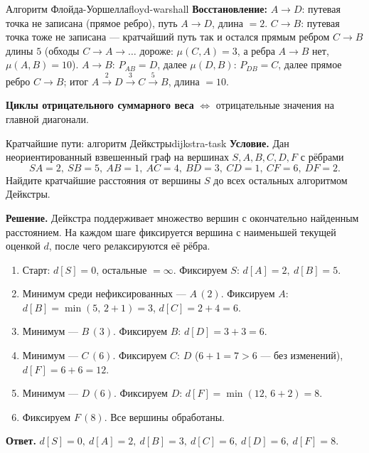 \begin{algo}{Алгоритм Флойда-Уоршелла}{floyd-warshall}
\textbf{Восстановление:}
$A \to D$: путевая точка не записана (прямое ребро), путь $A \to D$,
длина $= 2$.
$C \to B$: путевая точка тоже не записана --- кратчайший путь так и
остался прямым ребром $C \to B$ длины $5$ (обходы $C \to A \to \ldots$
дороже: $\mu(C,A) = 3$, а ребра $A \to B$ нет, $\mu(A,B) = 10$).
$A \to B$: $P_{AB} = D$, далее $\mu(D, B)$: $P_{DB} = C$, далее прямое
ребро $C \to B$; итог $A \xrightarrow{2} D \xrightarrow{3} C
\xrightarrow{5} B$, длина $= 10$.

\textbf{Циклы отрицательного суммарного веса} $\Leftrightarrow$ отрицательные значения на главной диагонали.

\end{algo}

\begin{task}{Кратчайшие пути: алгоритм Дейкстры}{dijkstra-task}
\textbf{Условие.} Дан неориентированный взвешенный граф на вершинах
$S,A,B,C,D,F$ с рёбрами
\[
  SA=2,\ SB=5,\ AB=1,\ AC=4,\ BD=3,\ CD=1,\ CF=6,\ DF=2.
\]
Найдите кратчайшие расстояния от вершины $S$ до всех остальных алгоритмом Дейкстры.

\smallskip
{}

\textbf{Решение.} Дейкстра поддерживает множество вершин с окончательно
найденным расстоянием. На каждом шаге фиксируется вершина с наименьшей текущей
оценкой $d$, после чего релаксируются её рёбра.
\begin{enumerate}
  \item Старт: $d[S]=0$, остальные $=\infty$. Фиксируем $S$:
        $d[A]=2,\ d[B]=5$.
  \item Минимум среди нефиксированных --- $A\,(2)$. Фиксируем $A$:
        $d[B]=\min(5,\,2+1)=3$, $d[C]=2+4=6$.
  \item Минимум --- $B\,(3)$. Фиксируем $B$: $d[D]=3+3=6$.
  \item Минимум --- $C\,(6)$. Фиксируем $C$: $D$ ($6+1=7>6$ --- без изменений),
        $d[F]=6+6=12$.
  \item Минимум --- $D\,(6)$. Фиксируем $D$: $d[F]=\min(12,\,6+2)=8$.
  \item Фиксируем $F\,(8)$. Все вершины обработаны.
\end{enumerate}


\textbf{Ответ.} $d[S]=0,\ d[A]=2,\ d[B]=3,\ d[C]=6,\ d[D]=6,\ d[F]=8$.
\end{task}

